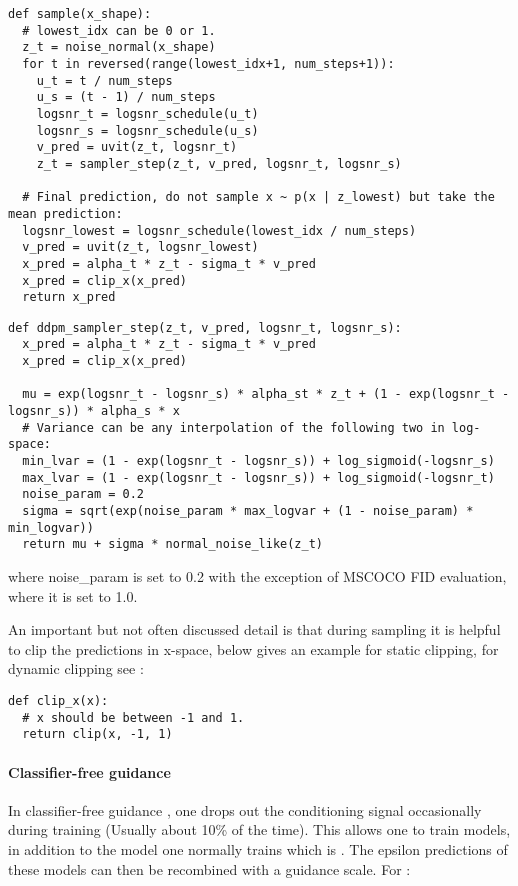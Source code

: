 \documentclass[nohyperref]{article}
\theoremstyle{plain}
\theoremstyle{definition}
\theoremstyle{remark}
\begin{document}
\begin{lstlisting}[style=python]
def sample(x_shape):
  # lowest_idx can be 0 or 1.
  z_t = noise_normal(x_shape)
  for t in reversed(range(lowest_idx+1, num_steps+1)):
    u_t = t / num_steps
    u_s = (t - 1) / num_steps
    logsnr_t = logsnr_schedule(u_t)
    logsnr_s = logsnr_schedule(u_s)
    v_pred = uvit(z_t, logsnr_t)
    z_t = sampler_step(z_t, v_pred, logsnr_t, logsnr_s)

  # Final prediction, do not sample x ~ p(x | z_lowest) but take the mean prediction:
  logsnr_lowest = logsnr_schedule(lowest_idx / num_steps)
  v_pred = uvit(z_t, logsnr_lowest)
  x_pred = alpha_t * z_t - sigma_t * v_pred
  x_pred = clip_x(x_pred)
  return x_pred
\end{lstlisting}


\begin{lstlisting}[style=python]
def ddpm_sampler_step(z_t, v_pred, logsnr_t, logsnr_s):
  x_pred = alpha_t * z_t - sigma_t * v_pred
  x_pred = clip_x(x_pred)
  
  mu = exp(logsnr_t - logsnr_s) * alpha_st * z_t + (1 - exp(logsnr_t - logsnr_s)) * alpha_s * x
  # Variance can be any interpolation of the following two in log-space:
  min_lvar = (1 - exp(logsnr_t - logsnr_s)) + log_sigmoid(-logsnr_s)
  max_lvar = (1 - exp(logsnr_t - logsnr_s)) + log_sigmoid(-logsnr_t)
  noise_param = 0.2
  sigma = sqrt(exp(noise_param * max_logvar + (1 - noise_param) * min_logvar))
  return mu + sigma * normal_noise_like(z_t)
\end{lstlisting}
where noise\_param is set to 0.2 with the exception of MSCOCO FID evaluation, where it is set to 1.0.

An important but not often discussed detail is that during sampling it is helpful to clip the predictions in x-space, below gives an example for static clipping, for dynamic clipping see \citep{saharia2022imagen}:
\begin{lstlisting}[style=python]
def clip_x(x):
  # x should be between -1 and 1.
  return clip(x, -1, 1)
\end{lstlisting}


\paragraph{Classifier-free guidance}
In classifier-free guidance \citep{ho2022classifierfreeguidance}, one drops out the conditioning signal occasionally during training (Usually about 10\% of the time). This allows one to train models,  in addition to the model one normally trains which is . The epsilon predictions of these models can then be recombined with a guidance scale. For :
\end{document}
